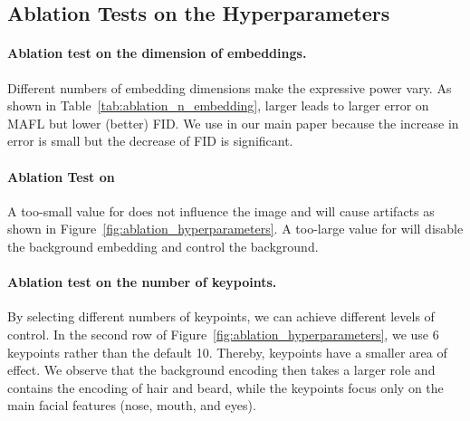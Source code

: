 \documentclass[10pt, conference, compsocconf]{IEEEtran}
\begin{document}
\subsection{Ablation Tests on the Hyperparameters}

\paragraph{Ablation test on the dimension of embeddings.} Different numbers of embedding dimensions make the expressive power vary. As shown in Table~\ref{tab:ablation_n_embedding}, larger  leads to larger error on MAFL but lower (better) FID. We use  in our main paper because the increase in error is small but the decrease of FID is significant.

\paragraph{Ablation Test on }
A too-small value for  does not influence the image and will cause artifacts as shown in Figure~\ref{fig:ablation_hyperparameters}. A too-large value for  will disable the background embedding and control the background.

\begin{table*}
\begin{center}
\end{center}
\caption{\textbf{Quantitative ablation test on dimension of embeddings.} For both metrics, the lower means better.}
\label{tab:ablation_n_embedding}
\end{table*}

\paragraph{Ablation test on the number of keypoints.} By selecting different numbers of keypoints, we can achieve different levels of control. In the second row of Figure~\ref{fig:ablation_hyperparameters}, we use 6 keypoints rather than the default 10. Thereby, keypoints have a smaller area of effect. We observe that the background encoding then takes a larger role and contains the encoding of hair and beard, while the keypoints focus only on the main facial features (nose, mouth, and eyes).
\end{document}
